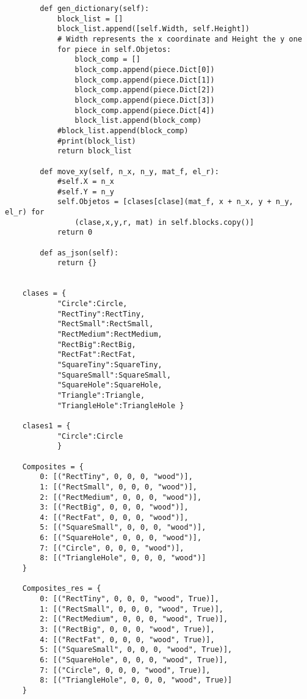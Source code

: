 \begin{verbatim}
        def gen_dictionary(self):
            block_list = []
            block_list.append([self.Width, self.Height]) 
            # Width represents the x coordinate and Height the y one
            for piece in self.Objetos:
                block_comp = []
                block_comp.append(piece.Dict[0])
                block_comp.append(piece.Dict[1])
                block_comp.append(piece.Dict[2])
                block_comp.append(piece.Dict[3])
                block_comp.append(piece.Dict[4])
                block_list.append(block_comp)
            #block_list.append(block_comp)
            #print(block_list)
            return block_list
        
        def move_xy(self, n_x, n_y, mat_f, el_r):
            #self.X = n_x
            #self.Y = n_y
            self.Objetos = [clases[clase](mat_f, x + n_x, y + n_y, el_r) for 
                (clase,x,y,r, mat) in self.blocks.copy()]
            return 0
        
        def as_json(self):
            return {}
        

    clases = {
            "Circle":Circle,
            "RectTiny":RectTiny,
            "RectSmall":RectSmall,
            "RectMedium":RectMedium,
            "RectBig":RectBig,
            "RectFat":RectFat,
            "SquareTiny":SquareTiny,
            "SquareSmall":SquareSmall,
            "SquareHole":SquareHole,
            "Triangle":Triangle,
            "TriangleHole":TriangleHole }

    clases1 = {
            "Circle":Circle
            }

    Composites = {
        0: [("RectTiny", 0, 0, 0, "wood")],
        1: [("RectSmall", 0, 0, 0, "wood")],
        2: [("RectMedium", 0, 0, 0, "wood")],
        3: [("RectBig", 0, 0, 0, "wood")],
        4: [("RectFat", 0, 0, 0, "wood")],
        5: [("SquareSmall", 0, 0, 0, "wood")],
        6: [("SquareHole", 0, 0, 0, "wood")],
        7: [("Circle", 0, 0, 0, "wood")],
        8: [("TriangleHole", 0, 0, 0, "wood")]
    }

    Composites_res = {
        0: [("RectTiny", 0, 0, 0, "wood", True)],
        1: [("RectSmall", 0, 0, 0, "wood", True)],
        2: [("RectMedium", 0, 0, 0, "wood", True)],
        3: [("RectBig", 0, 0, 0, "wood", True)],
        4: [("RectFat", 0, 0, 0, "wood", True)],
        5: [("SquareSmall", 0, 0, 0, "wood", True)],
        6: [("SquareHole", 0, 0, 0, "wood", True)],
        7: [("Circle", 0, 0, 0, "wood", True)],
        8: [("TriangleHole", 0, 0, 0, "wood", True)]
    }


\end{verbatim}
